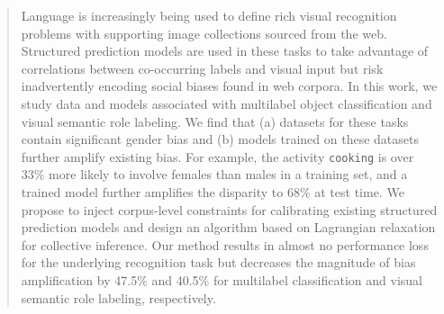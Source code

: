 \begin{abstract}
Language is increasingly being used to define rich visual recognition problems
with supporting image collections sourced from the web.
Structured prediction models are used in these tasks to take advantage of correlations between co-occurring labels and visual input but risk inadvertently encoding social biases found in web corpora.  
In this work, we study data and models associated with multilabel object classification and visual semantic role labeling.
We find that (a) datasets for these tasks contain significant gender bias and (b) models trained on these datasets further amplify existing bias.
For example, the activity \texttt{cooking} is over 33\% more likely to involve females than males in a training set, and a trained model further amplifies the disparity to 68\% at test time.
We propose to inject corpus-level constraints for calibrating existing structured prediction models and design an algorithm based on Lagrangian relaxation for collective inference.
Our method results in almost no performance loss for the underlying recognition task but decreases the magnitude of bias amplification by 47.5\% and 40.5\% for multilabel classification and visual semantic role labeling, respectively.


 
\end{abstract}